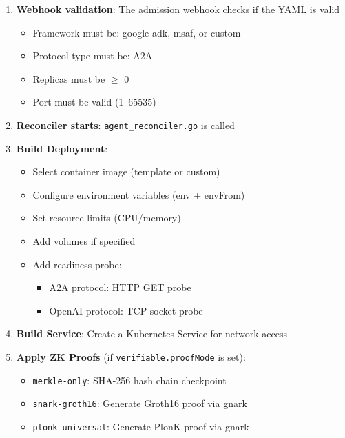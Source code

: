 \documentclass[12pt,a4paper,openany]{report}
\begin{document}
\begin{enumerate}
    \item \textbf{Webhook validation}: The admission webhook checks if the YAML is valid
    \begin{itemize}
        \item Framework must be: google-adk, msaf, or custom
        \item Protocol type must be: A2A
        \item Replicas must be $\geq$ 0
        \item Port must be valid (1--65535)
    \end{itemize}

    \item \textbf{Reconciler starts}: \texttt{agent\_reconciler.go} is called

    \item \textbf{Build Deployment}:
    \begin{itemize}
        \item Select container image (template or custom)
        \item Configure environment variables (env + envFrom)
        \item Set resource limits (CPU/memory)
        \item Add volumes if specified
        \item Add readiness probe:
        \begin{itemize}
            \item A2A protocol: HTTP GET probe
            \item OpenAI protocol: TCP socket probe
        \end{itemize}
    \end{itemize}

    \item \textbf{Build Service}: Create a Kubernetes Service for network access

    \item \textbf{Apply ZK Proofs} (if \texttt{verifiable.proofMode} is set):
    \begin{itemize}
        \item \texttt{merkle-only}: SHA-256 hash chain checkpoint
        \item \texttt{snark-groth16}: Generate Groth16 proof via gnark
        \item \texttt{plonk-universal}: Generate PlonK proof via gnark
    \end{itemize}


\end{enumerate}
\end{document}

